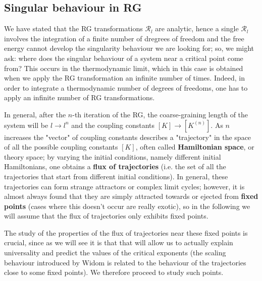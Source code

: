 \documentclass[../../Main/Main.tex]{subfiles}
\begin{document}
\subsection{Singular behaviour in RG}

We have stated that the RG transformations \( \mathcal{R}_l \) are analytic, hence a single \( \mathcal{R}_l \) involves the integration of a finite number of dregrees of freedom and the free energy cannot develop the singularity behaviour we are looking for; so, we might ask: where does the singular behaviour of a system near a critical point come from? This occurs in the thermodynamic limit, which in this case is obtained when we apply the RG transformation an infinite number of times. Indeed, in order to integrate a thermodynamic number of degrees of freedoms, one has to apply an infinite number of RG transformations.

In general, after the \( n \)-th iteration of the RG, the coarse-graining length of the system will be \( l \rightarrow l^n \) and the coupling constants \( [K] \rightarrow [K^{(n)}] \).
As \( n \) increases the "vector" of coupling constants describes a "trajectory" in the space of all the possible coupling constants \( [K] \), often called \textbf{Hamiltonian space}, or theory space;
by varying the initial conditions, namely different initial Hamiltonians, one obtains a
\textbf{flux of trajectories} (i.e. the set of all the trajectories that start from different initial conditions).
In general, these trajectories can form strange attractors or complex limit cycles; however, it is almost always found that they are simply attracted towards or ejected from \textbf{fixed points} (cases where this doesn't occur are really exotic), so in the following we will assume that the flux of trajectories only exhibits fixed points.

The study of the properties of the flux of trajectories near these fixed points is crucial, since as we will see it is that that will allow us to actually explain universality and predict the values of the critical exponents (the scaling behaviour introduced by Widom is related to the behaviour of the trajectories close to some fixed points). We therefore proceed to study such points.
\end{document}

